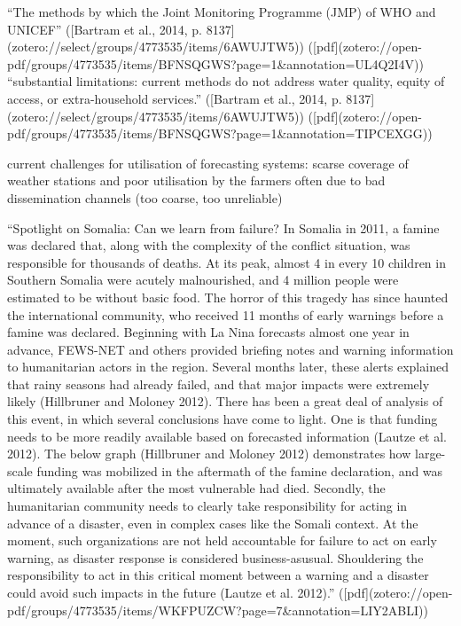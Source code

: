 “The methods by which the Joint Monitoring Programme (JMP) of WHO and UNICEF” ([Bartram et al., 2014, p. 8137](zotero://select/groups/4773535/items/6AWUJTW5)) ([pdf](zotero://open-pdf/groups/4773535/items/BFNSQGWS?page=1&annotation=UL4Q2I4V))
“substantial limitations: current methods do not address water quality, equity of access, or extra-household services.” ([Bartram et al., 2014, p. 8137](zotero://select/groups/4773535/items/6AWUJTW5)) ([pdf](zotero://open-pdf/groups/4773535/items/BFNSQGWS?page=1&annotation=TIPCEXGG))

current challenges for utilisation of forecasting systems: scarse coverage of weather stations and poor utilisation by the farmers often due to bad dissemination channels  (too coarse, too unreliable)






“Spotlight on Somalia: Can we learn from failure? In Somalia in 2011, a famine was declared that, along with the complexity of the conflict situation, was responsible for thousands of deaths. At its peak, almost 4 in every 10 children in Southern Somalia were acutely malnourished, and 4 million people were estimated to be without basic food. The horror of this tragedy has since haunted the international community, who received 11 months of early warnings before a famine was declared. Beginning with La Nina forecasts almost one year in advance, FEWS-NET and others provided briefing notes and warning information to humanitarian actors in the region. Several months later, these alerts explained that rainy seasons had already failed, and that major impacts were extremely likely (Hillbruner and Moloney 2012). There has been a great deal of analysis of this event, in which several conclusions have come to light. One is that funding needs to be more readily available based on forecasted information (Lautze et al. 2012). The below graph (Hillbruner and Moloney 2012) demonstrates how large-scale funding was mobilized in the aftermath of the famine declaration, and was ultimately available after the most vulnerable had died. Secondly, the humanitarian community needs to clearly take responsibility for acting in advance of a disaster, even in complex cases like the Somali context. At the moment, such organizations are not held accountable for failure to act on early warning, as disaster response is considered business-asusual. Shouldering the responsibility to act in this critical moment between a warning and a disaster could avoid such impacts in the future (Lautze et al. 2012).” ([pdf](zotero://open-pdf/groups/4773535/items/WKFPUZCW?page=7&annotation=LIY2ABLI))




